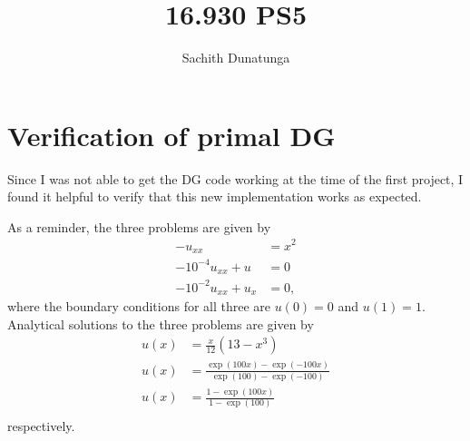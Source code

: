 \documentclass{article}
\begin{document}
\author{Sachith Dunatunga}
\title{16.930 PS5}
\maketitle

\section{Verification of primal DG}

Since I was not able to get the DG code working at the time of the first project, I found it helpful to verify that this new implementation works as expected.

As a reminder, the three problems are given by
\begin{align}
-u_{xx} &= x^2 \\
-10^{-4} u_{xx} + u &= 0 \\
-10^{-2} u_{xx} + u_x &= 0,
\end{align}
where the boundary conditions for all three are $u(0) = 0$ and $u(1) = 1$.
Analytical solutions to the three problems are given by
\begin{align}
u(x) &= \frac{x}{12} \left( 13 - x^3 \right) \\
u(x) &= \frac{\exp(100x) - \exp(-100x)}{\exp(100) - \exp(-100)} \\
u(x) &= \frac{1 - \exp(100x)}{1 - \exp(100)}\\
\end{align}
respectively.

\section{}
\end{document}

